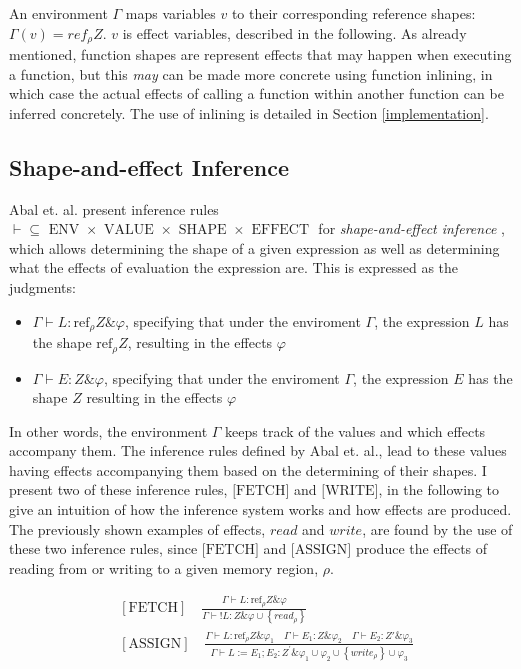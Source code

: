 \newpar An environment $\Gamma$ maps variables $v$ to their corresponding reference shapes: $\Gamma(v) = ref_\rho Z$. $v$ is effect variables, described in the following. As already mentioned, function shapes are represent effects that may happen when executing a function, but this \textit{may} can be made more concrete using function inlining, in which case the actual effects of calling a function within another function can be inferred concretely. The use of inlining is detailed in Section \ref{implementation}. 

\subsection{Shape-and-effect Inference}
Abal et. al. present inference rules $\vdash \subseteq \text { ENV } \times \text { VALUE } \times \text { SHAPE } \times \text { EFFECT }$ for \textit{shape-and-effect inference} \cite{Abal2017EffectiveBF}, which allows determining the shape of a given expression as well as determining what the effects of evaluation the expression are. This is expressed as the judgments: 

\begin{itemize}
    \item $\Gamma \vdash L: \text{ref}_{\rho} Z \& \varphi$, specifying that under the enviroment $\Gamma$, the expression $L$ has the shape $\text{ref}_\rho Z$, resulting in the effects $\varphi$
    \item $\Gamma \vdash E: Z \& \varphi$, specifying that under the enviroment $\Gamma$, the expression $E$ has the shape $Z$ resulting in the effects $\varphi$
\end{itemize}

\noindent In other words, the environment $\Gamma$ keeps track of the values and which effects accompany them. The inference rules defined by Abal et. al., lead to these values having effects accompanying them based on the determining of their shapes. I present two of these inference rules, $\text{[FETCH]}$ and $\text{[WRITE]}$, in the following to give an intuition of how the inference system works and how effects are produced. The previously shown examples of effects, $read$ and $write$, are found by the use of these two inference rules, since $\text{[FETCH]}$ and $\text{[ASSIGN]}$ produce the effects of reading from or writing to a given memory region, $\rho$. 

\begin{equation*}
\begin{aligned}
    &[\text{FETCH}] \quad \frac{\Gamma \vdash L: \text{ref}_{\rho} Z \& \varphi}{\Gamma \vdash {!L}: Z \& \varphi \cup\left\{r e a d_{\rho}\right\}}\\
    &[\text{ASSIGN}] \quad \frac{\Gamma \vdash L: \mathrm{ref}_{\rho} Z \& \varphi_{1} \quad \Gamma \vdash E_{1}: Z \& \varphi_{2} \quad \Gamma \vdash E_{2}: Z' \& \varphi_{3}}{\Gamma \vdash L:=E_{1} ; E_{2}: Z^{\prime} \& \varphi_{1} \cup \varphi_{2} \cup\left\{w r i t e_{\rho}\right\} \cup \varphi_{3}}
\end{aligned}
\end{equation*}

